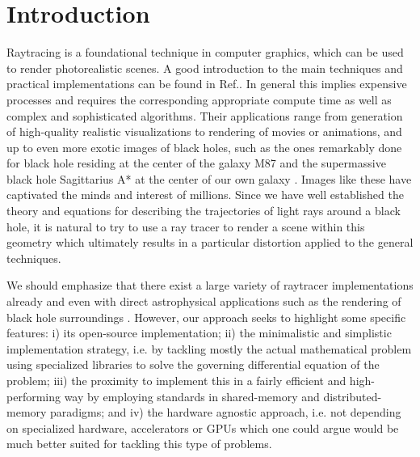 

\section{Introduction}
\label{sec:intro}



Raytracing is a foundational technique in computer graphics, which can be used
to render photorealistic scenes.
A good introduction to the main techniques and practical implementations can be found
in Ref.\cite{raytracing_in_one_weekend}.
In general this implies expensive processes and requires the corresponding appropriate compute time
as well as complex and sophisticated algorithms.
Their applications range from generation of high-quality realistic visualizations to
rendering of movies or animations, and up to even more exotic images of black holes,
such as the ones remarkably done for black hole residing at the center of the galaxy M87 \cite{M87_EHT_i}
and the supermassive black hole Sagittarius A* at the center of our own galaxy \cite{SagA_EHT_i}. Images like these have captivated the minds and interest of millions. 
Since we have well established the theory and equations for describing the trajectories of light rays around a black hole, it is natural to try to use a ray tracer to render a scene within this geometry which ultimately results in a particular distortion applied to the general techniques.

We should emphasize that there exist a large variety of raytracer implementations already 
\cite{imbens2023graphicalprocessinggeodesicpropagation,10.2312/EGPGV/EGPGV12/051-060,7539599_OSPRay}
and even with direct astrophysical applications such as the rendering of black hole surroundings
\cite{10.2312:vmv.20221208,sharma2023mahakalapythonbasedmodularraytracing,James_2015}.
However, our approach seeks to highlight some specific features:
i) its open-source implementation;
ii) the minimalistic and simplistic implementation strategy, i.e. by tackling
mostly the actual mathematical problem using specialized libraries
to solve the governing differential equation of the problem;
iii) the proximity  to implement this in a fairly efficient and high-performing
way by employing standards in shared-memory and distributed-memory paradigms;
and iv) the hardware agnostic approach, i.e. not depending on specialized hardware, accelerators or GPUs which one could argue would be much better suited for tackling this type of problems.

